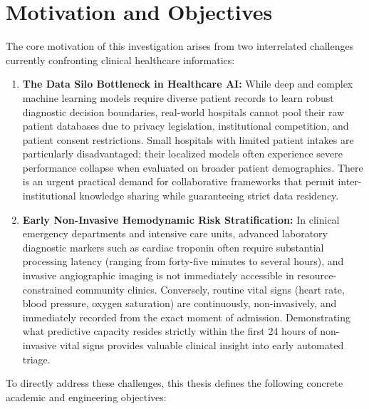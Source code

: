 \section{Motivation and Objectives}
\label{sec:motivation_objectives}

The core motivation of this investigation arises from two interrelated challenges currently confronting clinical healthcare informatics:

\begin{enumerate}
    \item \textbf{The Data Silo Bottleneck in Healthcare AI:} While deep and complex machine learning models require diverse patient records to learn robust diagnostic decision boundaries, real-world hospitals cannot pool their raw patient databases due to privacy legislation, institutional competition, and patient consent restrictions. Small hospitals with limited patient intakes are particularly disadvantaged; their localized models often experience severe performance collapse when evaluated on broader patient demographics. There is an urgent practical demand for collaborative frameworks that permit inter-institutional knowledge sharing while guaranteeing strict data residency.
    
    \item \textbf{Early Non-Invasive Hemodynamic Risk Stratification:} In clinical emergency departments and intensive care units, advanced laboratory diagnostic markers such as cardiac troponin often require substantial processing latency (ranging from forty-five minutes to several hours), and invasive angiographic imaging is not immediately accessible in resource-constrained community clinics. Conversely, routine vital signs (heart rate, blood pressure, oxygen saturation) are continuously, non-invasively, and immediately recorded from the exact moment of admission. Demonstrating what predictive capacity resides strictly within the first 24 hours of non-invasive vital signs provides valuable clinical insight into early automated triage.
\end{enumerate}

To directly address these challenges, this thesis defines the following concrete academic and engineering objectives:

